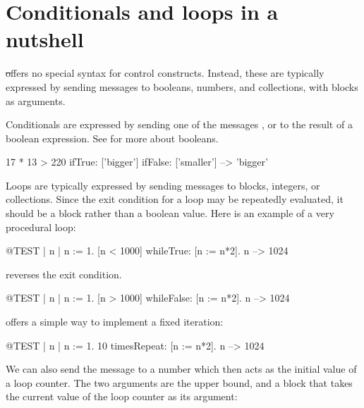 \documentclass[a4paper,10pt,twoside]{book}
\begin{document}
\section{Conditionals and loops in a nutshell}

\st offers no special syntax for control constructs.
Instead, these are typically expressed by sending messages to booleans, numbers, and collections, with blocks as arguments.

Conditionals are expressed by sending one of the messages ,  or  to the result of a boolean expression.
See  for more about booleans.

\begin{code}{}
17 * 13 > 220
   ifTrue: ['bigger']
   ifFalse: ['smaller'] --> 'bigger'
\end{code}

Loops are typically expressed by sending messages to blocks, integers, or collections.
Since the exit condition for a loop may be repeatedly evaluated, it should be a block rather than a boolean value.
Here is an example of a very procedural loop:

\begin{code}{@TEST | n |}
n := 1.
[n < 1000] whileTrue: [n := n*2].
n --> 1024
\end{code}

\noindent
{} reverses the exit condition.
\begin{code}{@TEST | n |}
n := 1.
[n > 1000] whileFalse: [n := n*2].
n --> 1024
\end{code}

\noindent
{} offers a simple way to implement a fixed iteration:

\begin{code}{@TEST | n |}
n := 1.
10 timesRepeat: [n := n*2].
n --> 1024
\end{code}

We can also send the message  to a number which then acts as the initial value of a loop counter.
The two arguments are the upper bound, and a block that takes the current value of the loop counter as its argument:
\end{document}
